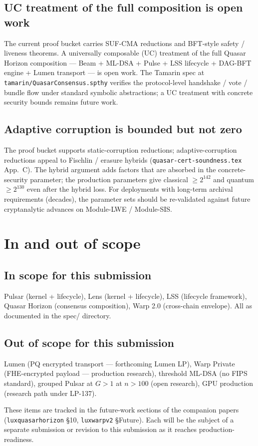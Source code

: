 \documentclass[11pt]{article}
\begin{document}
\subsection{UC treatment of the full composition is open work}

The current proof bucket carries SUF-CMA reductions and BFT-style safety /
liveness theorems. A universally composable (UC) treatment of the full
Quasar Horizon composition --- Beam + ML-DSA + Pulse + LSS lifecycle +
DAG-BFT engine + Lumen transport --- is open work. The Tamarin spec at
\verb|tamarin/QuasarConsensus.spthy| verifies the protocol-level handshake /
vote / bundle flow under standard symbolic abstractions; a UC treatment with
concrete security bounds remains future work.

\subsection{Adaptive corruption is bounded but not zero}

The proof bucket supports static-corruption reductions; adaptive-corruption
reductions appeal to Fischlin / erasure hybrids
(\verb|quasar-cert-soundness.tex| App.~C). The hybrid argument adds factors
that are absorbed in the concrete-security parameter; the production
parameters give classical $\geq 2^{142}$ and quantum $\geq 2^{130}$ even
after the hybrid loss. For deployments with long-term archival requirements
(decades), the parameter sets should be re-validated against future
cryptanalytic advances on Module-LWE / Module-SIS.

\section{In and out of scope}

\subsection*{In scope for this submission}

Pulsar (kernel + lifecycle), Lens (kernel + lifecycle), LSS (lifecycle
framework), Quasar Horizon (consensus composition), Warp 2.0 (cross-chain
envelope). All as documented in the spec/ directory.

\subsection*{Out of scope for this submission}

Lumen (PQ encrypted transport --- forthcoming Lumen LP), Warp Private
(FHE-encrypted payload --- production research), threshold ML-DSA (no FIPS
standard), grouped Pulsar at $G > 1$ at $n > 100$ (open research), GPU
production (research path under LP-137).

These items are tracked in the future-work sections of the companion papers
(\verb|luxquasarhorizon| \S10, \verb|luxwarpv2| \S Future). Each will be the
subject of a separate submission or revision to this submission as it
reaches production-readiness.
\end{document}
